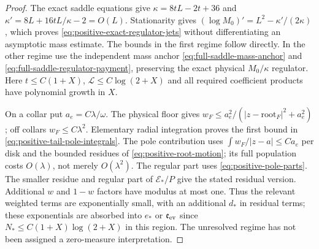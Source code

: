 \begin{proof}
The exact saddle equations give
$\kappa=8tL-2t+36$ and
$\kappa'=8L+16tL/\kappa-2=O(L)$.
Stationarity gives $(\log M_0)'=L^2-\kappa'/(2\kappa)$,
which proves \eqref{eq:positive-exact-regulator-jets} without
differentiating an asymptotic mass estimate. The bounds in the first
regime follow directly. In the other regime use the independent mass
anchor \eqref{eq:full-saddle-mass-anchor} and
\eqref{eq:full-saddle-regulator-payment}, preserving the exact physical
$M_0/\kappa$ regulator. Here $t\le C(1+X)$,
$\mathcal L\le C\log(2+X)$ and all required coefficient products
have polynomial growth in $X$.

On a collar put $a_e=C\lambda/\omega$.
The physical floor gives
$w_F\le a_e^2/(|z-\text{root}_F|^2+a_e^2)$;
off collars $w_F\le C\lambda^2$.
Elementary radial integration proves the first bound in
\eqref{eq:positive-tail-pole-integrals}.
The pole contribution uses
$\int w_F/|z-a|\le Ca_e$ per disk and the bounded residues of
\eqref{eq:positive-root-motion}; its full population costs
$O(\lambda)$, not merely $O(\lambda^2)$.
The regular part uses \eqref{eq:positive-pole-parts}.
The smaller residue and regular part of $\mathcal E_*/P$ give the
stated residual version. Additional $w$ and $1-w$ factors have modulus
at most one. Thus the relevant weighted terms are exponentially small,
with an additional $d_*$ in residual terms; these exponentials are
absorbed into $e_*$ or $\mathfrak e_{\rm ev}$ since
$N_*\le C(1+X)\log(2+X)$ in this region. The unresolved regime has
not been assigned a zero-measure interpretation.
\end{proof}

